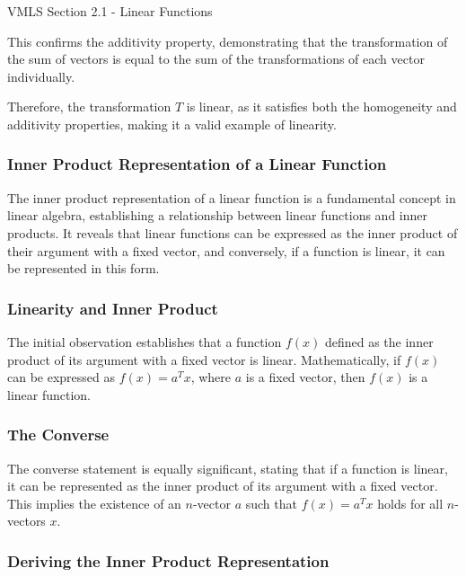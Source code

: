 \begin{notes}{VMLS Section 2.1 - Linear Functions}
\begin{highlight}
\begin{enumerate}
            This confirms the additivity property, demonstrating that the transformation of the sum of vectors is equal to the sum of the transformations of each vector individually.
        \end{enumerate}
        Therefore, the transformation \(T\) is linear, as it satisfies both the homogeneity and additivity properties, making it a valid example of linearity.
    \end{highlight}

    \subsubsection*{Inner Product Representation of a Linear Function}
    
    The inner product representation of a linear function is a fundamental concept in linear algebra, establishing a relationship between linear functions and inner products. It reveals that linear functions can be expressed 
    as the inner product of their argument with a fixed vector, and conversely, if a function is linear, it can be represented in this form.
    
    \subsubsection*{Linearity and Inner Product}
    
    The initial observation establishes that a function \(f(x)\) defined as the inner product of its argument with a fixed vector is linear. Mathematically, if \(f(x)\) can be expressed as \(f(x) = a^T x\), where \(a\) is a 
    fixed vector, then \(f(x)\) is a linear function.
    
    \subsubsection*{The Converse}
    
    The converse statement is equally significant, stating that if a function is linear, it can be represented as the inner product of its argument with a fixed vector. This implies the existence of an \(n\)-vector \(a\) such 
    that \(f(x) = a^T x\) holds for all \(n\)-vectors \(x\).
    
    \subsubsection*{Deriving the Inner Product Representation}
    

\end{notes}
